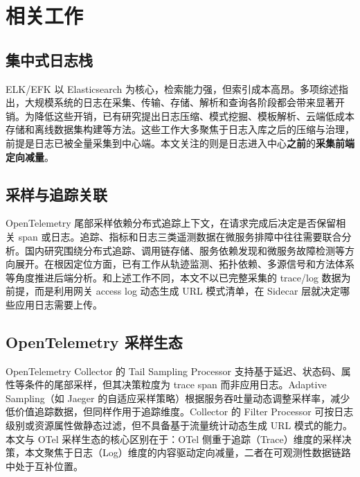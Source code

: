 \section{相关工作}

\subsection{集中式日志栈}
ELK/EFK 以 Elasticsearch 为核心，检索能力强，但索引成本高昂。多项综述指出，大规模系统的日志在采集、传输、存储、解析和查询各阶段都会带来显著开销\cite{liao2016logs,limingshu2019logmgmt,he2020logsurvey,chen2020loganomaly}。为降低这些开销，已有研究提出日志压缩、模式挖掘、模板解析、云端低成本存储和离线数据集构建等方法\cite{liu2019logzip,zhu2020loghub,wei2023cloudlogstorage,khan2022logtemplate}。这些工作大多聚焦于日志入库之后的压缩与治理，前提是日志已被全量采集到中心端。本文关注的则是日志进入中心\textbf{之前}的\textbf{采集前端定向减量}。

\subsection{采样与追踪关联}
OpenTelemetry 尾部采样依赖分布式追踪上下文，在请求完成后决定是否保留相关 span 或日志\cite{otel_tail}。追踪、指标和日志三类遥测数据在微服务排障中往往需要联合分析\cite{usman2022observability,maruf2022telemetry,moreschini2023microai}。国内研究围绕分布式追踪、调用链存储、服务依赖发现和微服务故障检测等方向展开\cite{yang2020tracingsurvey,huang2023javatrace,you2021tracelogstorage,yuqingyang2022trace,zhang2024servicedep,wanglu2023microfault}。在根因定位方面，已有工作从轨迹监测、拓扑依赖、多源信号和方法体系等角度推进后端分析\cite{wang2017tracefault,wu2020microrca,zhang2023multimodal,wang2024rca}。和上述工作不同，本文不以已完整采集的 trace/log 数据为前提，而是利用网关 access log 动态生成 URL 模式清单，在 Sidecar 层就决定哪些应用日志需要上传。

\subsection{OpenTelemetry 采样生态}
OpenTelemetry Collector 的 Tail Sampling Processor 支持基于延迟、状态码、属性等条件的尾部采样，但其决策粒度为 trace span 而非应用日志\cite{otel_tail}。Adaptive Sampling（如 Jaeger 的自适应采样策略）根据服务吞吐量动态调整采样率，减少低价值追踪数据，但同样作用于追踪维度\cite{sridharan2018distributed}。Collector 的 Filter Processor 可按日志级别或资源属性做静态过滤，但不具备基于流量统计动态生成 URL 模式的能力。本文与 OTel 采样生态的核心区别在于：OTel 侧重于追踪（Trace）维度的采样决策，本文聚焦于日志（Log）维度的内容驱动定向减量，二者在可观测性数据链路中处于互补位置。

